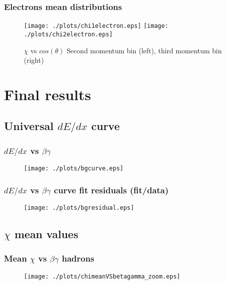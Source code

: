 \documentclass{beamer}
\begin{document}
\begin{frame}\frametitle{Electrons mean distributions}
\begin{figure}[!htp]
\centering
\texttt{[image: ./plots/chi1electron.eps]}
\texttt{[image: ./plots/chi2electron.eps]}
\caption{$\chi$ vs $cos(\theta)$ Second momentum bin (left), third momentum bin (right)}
\end{figure}
\end{frame}



\section{Final results}
\subsection{Universal \texorpdfstring{$dE/dx$}{dE/dx} curve}
\begin{frame}\frametitle{ $dE/dx$ vs $\beta \gamma$}
\begin{figure}
\texttt{[image: ./plots/bgcurve.eps]} 
\end{figure}
\end{frame}

\begin{frame}\frametitle{ $dE/dx$ vs $\beta \gamma$ curve fit residuals (fit/data)}
\begin{figure}
\texttt{[image: ./plots/bgresidual.eps]} 
\end{figure}
\end{frame}


\subsection{\texorpdfstring{$\chi$}{chi} mean values}
\begin{frame}\frametitle{Mean $\chi$ vs $\beta \gamma$ hadrons}
\begin{figure}
\texttt{[image: ./plots/chimeanVSbetagamma\_zoom.eps]} 
\end{figure}
\end{frame}
\end{document}
